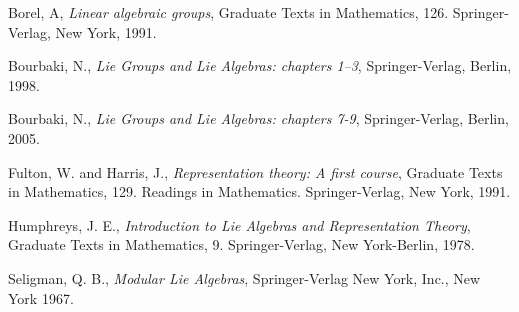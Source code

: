 \documentclass{amsart}
\theoremstyle{definition}
\theoremstyle{remark}
\numberwithin{equation}{section}
\begin{document}
%
\begin{thebibliography}{FH}

   Borel, A,
\emph{Linear algebraic groups},
Graduate Texts in Mathematics, 126. Springer-Verlag, New York, 1991.

  Bourbaki, N.,
\emph{Lie Groups and Lie Algebras: chapters 1--3}, Springer-Verlag, Berlin, 1998.

  Bourbaki, N.,
\emph{Lie Groups and Lie Algebras: chapters 7-9}, Springer-Verlag, Berlin, 2005.

   Fulton, W. and Harris, J.,
\emph{Representation theory: A first course}, Graduate Texts in Mathematics, 129.
Readings in Mathematics. Springer-Verlag, New York, 1991.

  Humphreys, J. E.,
\emph{Introduction to Lie Algebras and Representation Theory},
Graduate Texts in Mathematics, 9. Springer-Verlag, New York-Berlin, 1978.

 Seligman, Q. B.,
\emph{Modular Lie Algebras}, Springer-Verlag New York, Inc., New York 1967.

\end{thebibliography}
\end{document}
